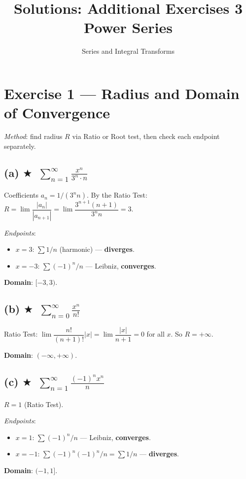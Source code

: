 \documentclass[12pt,a4paper]{article}
\title{\textbf{Solutions: Additional Exercises 3}\\Power Series}
\author{Series and Integral Transforms}
\date{}
\newcommand{\easy}{\textcolor{green!60!black}{$\bigstar$}}
\begin{document}
\maketitle

\section*{Exercise 1 — Radius and Domain of Convergence}

\textit{Method}: find radius $R$ via Ratio or Root test, then check each endpoint separately.

\subsection*{(a) \easy\ $\displaystyle\sum_{n=1}^{\infty}\frac{x^n}{3^n \cdot n}$}

Coefficients $a_n=1/(3^n n)$.  By the Ratio Test:
$R = \lim\dfrac{|a_n|}{|a_{n+1}|} = \lim\dfrac{3^{n+1}(n+1)}{3^n n} = 3$.

\textit{Endpoints}:
\begin{itemize}
  \item $x=3$: $\sum 1/n$ (harmonic) — \textbf{diverges}.
  \item $x=-3$: $\sum(-1)^n/n$ — Leibniz, \textbf{converges}.
\end{itemize}
\textbf{Domain}: $[-3, 3)$.

\subsection*{(b) \easy\ $\displaystyle\sum_{n=0}^{\infty}\frac{x^n}{n!}$}

Ratio Test: $\lim\dfrac{n!}{(n+1)!}|x|=\lim\dfrac{|x|}{n+1}=0$ for all $x$.  So $R=+\infty$.

\textbf{Domain}: $(-\infty, +\infty)$.

\subsection*{(c) \easy\ $\displaystyle\sum_{n=1}^{\infty}\frac{(-1)^n x^n}{n}$}

$R=1$ (Ratio Test).

\textit{Endpoints}:
\begin{itemize}
  \item $x=1$: $\sum(-1)^n/n$ — Leibniz, \textbf{converges}.
  \item $x=-1$: $\sum(-1)^n(-1)^n/n=\sum 1/n$ — \textbf{diverges}.
\end{itemize}
\textbf{Domain}: $(-1, 1]$.
\end{document}
